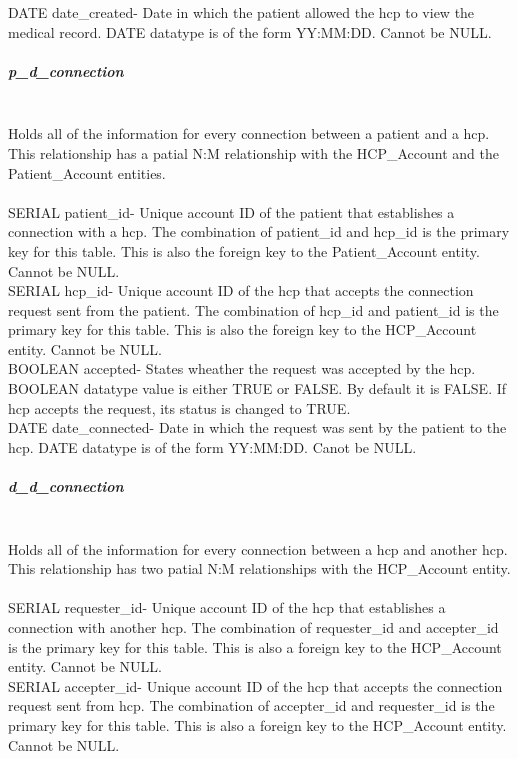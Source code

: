 \documentclass[12pt]{report}
\begin{document}
DATE date_created-  Date in which the patient allowed the hcp to view the medical record.  DATE datatype is of the form YY:MM:DD.  Cannot be NULL.\\

\subparagraph{p_d_connection}\\
Holds all of the information for every connection between a patient and a hcp.  This relationship has a patial N:M relationship with the HCP_Account and the Patient_Account entities.\\ \\

SERIAL patient_id- Unique account ID of the patient that establishes a connection with a hcp.  The combination of patient_id and hcp_id is the primary key for this table.  This is also the foreign key to the Patient_Account entity.  Cannot be NULL.\\  

SERIAL hcp_id- Unique account ID of the hcp that accepts the connection request sent from the patient.  The combination of hcp_id and patient_id is the primary key for this table.  This is also the foreign key to the HCP_Account entity.  Cannot be NULL.\\

BOOLEAN accepted- States wheather the request was accepted by the hcp.  BOOLEAN datatype value is either TRUE or FALSE.  By default it is FALSE.  If hcp accepts the request, its status is changed to TRUE.\\

DATE date_connected- Date in which the request was sent by the patient to the hcp.  DATE datatype is of the form YY:MM:DD.  Canot be NULL.\\

\subparagraph{d_d_connection}\\
Holds all of the information for every connection between a hcp and another hcp.  This relationship has two patial N:M relationships with the HCP_Account entity.\\ \\

SERIAL requester_id- Unique account ID of the hcp that establishes a connection with another hcp.  The combination of requester_id and accepter_id is the primary key for this table.  This is also a foreign key to the HCP_Account entity.  Cannot be NULL.\\  

SERIAL accepter_id- Unique account ID of the hcp that accepts the connection request sent from hcp.  The combination of accepter_id and requester_id is the primary key for this table.  This is also a foreign key to the HCP_Account entity.  Cannot be NULL.\\
\end{document}
